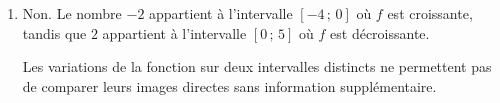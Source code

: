 \begin{methode}
\begin{correction}
\begin{enumerate}
			      Comme $1 < 4$, la fonction $f$ renverse l'ordre, d'où $f(1) > f(4)$.
			\item Non. Le nombre $-2$ appartient à l'intervalle $[-4 \,;\, 0]$ où $f$ est croissante, tandis que $2$ appartient à l'intervalle $[0 \,;\, 5]$ où $f$ est décroissante.

			      Les variations de la fonction sur deux intervalles distincts ne permettent pas de comparer leurs images directes sans information supplémentaire.
		\end{enumerate}
	\end{correction}
\end{methode}
